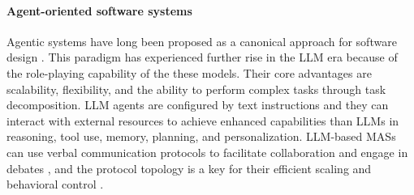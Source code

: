 \documentclass[11pt]{article}
\begin{document}
\paragraph{Agent-oriented software systems} Agentic systems have long been proposed as a canonical approach for software design \citep{jennings_absoft_2001,zambonelli_developing_2003}. This paradigm has experienced further rise in the LLM era \citep{wang_agents_2024} because of the role-playing capability \citep{Shanahan2023,chen_persona_2024} of the these models. Their core advantages are scalability, flexibility, and the ability to perform complex tasks through task decomposition. 
LLM agents \citep{li_llmagents_2025} are configured by text instructions and they can interact with external resources to achieve enhanced capabilities than LLMs in reasoning, tool use, memory, planning, and personalization. LLM-based MASs can use verbal communication protocols to facilitate collaboration and engage in debates \citep{tran_multiagent_2025}, and the protocol topology is a key for their efficient scaling and behavioral control \citep{qian_scaling_2025}.
\end{document}
